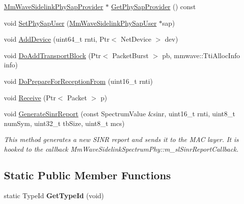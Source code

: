 \begin{DoxyCompactItemize}
\item 
\hyperlink{classns3_1_1millicar_1_1MmWaveSidelinkPhySapProvider}{Mm\+Wave\+Sidelink\+Phy\+Sap\+Provider} $\ast$ \hyperlink{classns3_1_1millicar_1_1MmWaveSidelinkPhy_ab8df82d08b89cfa181a548ca935409bf}{Get\+Phy\+Sap\+Provider} () const
\item 
void \hyperlink{classns3_1_1millicar_1_1MmWaveSidelinkPhy_af8a8ca9aa014acc288b7f36e549c56f7}{Set\+Phy\+Sap\+User} (\hyperlink{classns3_1_1millicar_1_1MmWaveSidelinkPhySapUser}{Mm\+Wave\+Sidelink\+Phy\+Sap\+User} $\ast$sap)
\item 
void \hyperlink{classns3_1_1millicar_1_1MmWaveSidelinkPhy_a8dbf76a5946b77c520dbcc2313c32bf6}{Add\+Device} (uint64\+\_\+t rnti, Ptr$<$ Net\+Device $>$ dev)
\item 
void \hyperlink{classns3_1_1millicar_1_1MmWaveSidelinkPhy_a9a6b48f434ad30b0c61d246c6a98c766}{Do\+Add\+Transport\+Block} (Ptr$<$ Packet\+Burst $>$ pb, mmwave\+::\+Tti\+Alloc\+Info info)
\item 
void \hyperlink{classns3_1_1millicar_1_1MmWaveSidelinkPhy_a8b5f228e68d5f66539d99bada58eff17}{Do\+Prepare\+For\+Reception\+From} (uint16\+\_\+t rnti)
\item 
void \hyperlink{classns3_1_1millicar_1_1MmWaveSidelinkPhy_a5721f99acca7de2ee5c9ae8e926eb48a}{Receive} (Ptr$<$ Packet $>$ p)
\item 
void \hyperlink{classns3_1_1millicar_1_1MmWaveSidelinkPhy_aa58a85f3e170a5ede36af9eb16604460}{Generate\+Sinr\+Report} (const Spectrum\+Value \&sinr, uint16\+\_\+t rnti, uint8\+\_\+t num\+Sym, uint32\+\_\+t tb\+Size, uint8\+\_\+t mcs)
\begin{DoxyCompactList}\small\item\em This method generates a new S\+I\+NR report and sends it to the M\+AC layer. It is hooked to the callback Mm\+Wave\+Sidelink\+Spectrum\+Phy\+::m\+\_\+sl\+Sinr\+Report\+Callback. \end{DoxyCompactList}\end{DoxyCompactItemize}
\subsection*{Static Public Member Functions}
\begin{DoxyCompactItemize}
\item 
\mbox{\label{classns3_1_1millicar_1_1MmWaveSidelinkPhy_a449b4b555c92a6d23be5b5926b095355}} 
static Type\+Id {\bfseries Get\+Type\+Id} (void)
\end{DoxyCompactItemize}


